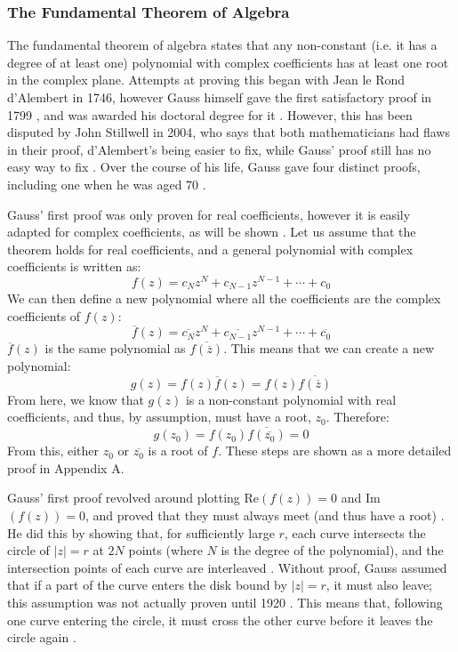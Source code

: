 \documentclass{article}
\begin{document}
\subsubsection{The Fundamental Theorem of Algebra}

The fundamental theorem of algebra states that any non-constant (i.e. it has a degree of at least one) polynomial with complex coefficients has at least one root in the complex plane. Attempts at proving this began with Jean le Rond d'Alembert in 1746, however Gauss himself gave the first satisfactory proof in 1799 \cite{fundamentaltheorem}, and was awarded his doctoral degree for it \cite{menofmaths}. However, this has been disputed by John Stillwell in 2004, who says that both mathematicians had flaws in their proof, d'Alembert's being easier to fix, while Gauss' proof still has no easy way to fix \cite{fundamentaltheorem}. Over the course of his life, Gauss gave four distinct proofs, including one when he was aged 70 \cite{menofmaths}.

Gauss' first proof was only proven for real coefficients, however it is easily adapted for complex coefficients, as will be shown \cite{fundamentaltheorem}. Let us assume that the theorem holds for real coefficients, and a general polynomial with complex coefficients is written as:
\[f(z) = c_{N}z^{N} + c_{N-1}z^{N-1} + \cdots + c_0\]
We can then define a new polynomial where all the coefficients are the complex coefficients of \(f(z)\):
\[\overline{f}(z) = \overline{c_{N}}z^{N} + \overline{c_{N-1}}z^{N-1} + \cdots + \overline{c_0}\]
\(\overline{f}(z)\) is the same polynomial as \(\overline{f({\overline{z}})}\).
This means that we can create a new polynomial:
\[g(z) = f(z)\overline{f}(z) = f(z)\overline{f({\overline{z}})}\]
From here, we know that \(g(z)\) is a non-constant polynomial with real coefficients, and thus, by assumption, must have a root, \(z_0\). Therefore:
\[g(z_0) = f(z_0)\overline{f({\overline{z_0}})} = 0\] 
From this, either \(z_0\) or \(\overline{z_0}\) is a root of \(f\). These steps are shown as a more detailed proof in Appendix A.

Gauss' first proof revolved around plotting Re\((f(z)) = 0\) and Im\((f(z)) = 0\), and proved that they must always meet (and thus have a root) \cite{fundamentaltheorem}. He did this by showing that, for sufficiently large \(r\), each curve intersects the circle of \(|z| = r\) at \(2N\) points (where \(N\) is the degree of the polynomial), and the intersection points of each curve are interleaved \cite{fundamentaltheorem}. Without proof, Gauss assumed that if a part of the curve enters the disk bound by \(|z| = r\), it must also leave; this assumption was not actually proven until 1920 \cite{fundamentaltheorem}. This means that, following one curve entering the circle, it must cross the other curve before it leaves the circle again \cite{fundamentaltheorem}.
\end{document}

